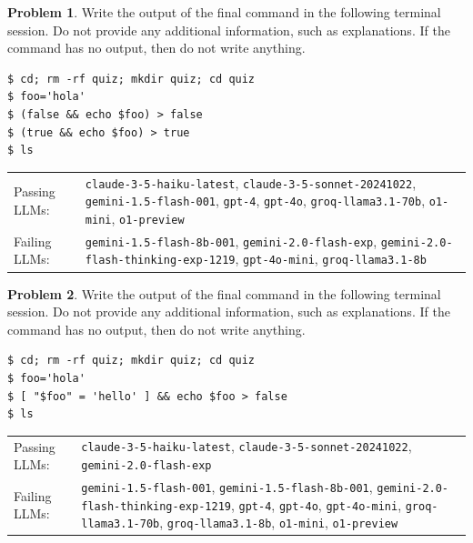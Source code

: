 \documentclass[10pt]{article}
\theoremstyle{definition}
\newtheorem{problem}{Problem}
\begin{document}
\noindent\vspace{0.1in}\begin{minipage}{\textwidth}

\begin{problem}
Write the output of the final command in the following terminal session.
Do not provide any additional information,
such as explanations.
If the command has no output,
then do not write anything.

\end{problem}
\begin{lstlisting}
$ cd; rm -rf quiz; mkdir quiz; cd quiz
$ foo='hola'
$ (false && echo $foo) > false
$ (true && echo $foo) > true
$ ls
\end{lstlisting}


\noindent
\begin{tabular}{p{1.0in}L{5in}}
Passing LLMs: & {\lstinline$claude-3-5-haiku-latest$}, {\lstinline$claude-3-5-sonnet-20241022$}, {\lstinline$gemini-1.5-flash-001$}, {\lstinline$gpt-4$}, {\lstinline$gpt-4o$}, {\lstinline$groq-llama3.1-70b$}, {\lstinline$o1-mini$}, {\lstinline$o1-preview$} \\
Failing LLMs: & {\lstinline$gemini-1.5-flash-8b-001$}, {\lstinline$gemini-2.0-flash-exp$}, {\lstinline$gemini-2.0-flash-thinking-exp-1219$}, {\lstinline$gpt-4o-mini$}, {\lstinline$groq-llama3.1-8b$} \\
\end{tabular}

\end{minipage}
\noindent\vspace{0.1in}\begin{minipage}{\textwidth}

\begin{problem}
Write the output of the final command in the following terminal session.
Do not provide any additional information,
such as explanations.
If the command has no output,
then do not write anything.

\end{problem}
\begin{lstlisting}
$ cd; rm -rf quiz; mkdir quiz; cd quiz
$ foo='hola'
$ [ "$foo" = 'hello' ] && echo $foo > false
$ ls
\end{lstlisting}


\noindent
\begin{tabular}{p{1.0in}L{5in}}
Passing LLMs: & {\lstinline$claude-3-5-haiku-latest$}, {\lstinline$claude-3-5-sonnet-20241022$}, {\lstinline$gemini-2.0-flash-exp$} \\
Failing LLMs: & {\lstinline$gemini-1.5-flash-001$}, {\lstinline$gemini-1.5-flash-8b-001$}, {\lstinline$gemini-2.0-flash-thinking-exp-1219$}, {\lstinline$gpt-4$}, {\lstinline$gpt-4o$}, {\lstinline$gpt-4o-mini$}, {\lstinline$groq-llama3.1-70b$}, {\lstinline$groq-llama3.1-8b$}, {\lstinline$o1-mini$}, {\lstinline$o1-preview$} \\
\end{tabular}

\end{minipage}
\end{document}
